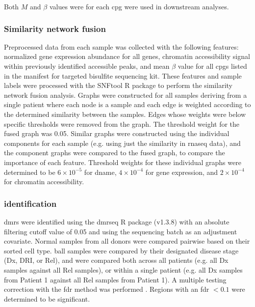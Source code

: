 Both $M$ and $\beta$ values were for each \gls{cpg} were used in downstream analyses.

\subsubsection{Similarity network fusion}

Preprocessed data from each sample was collected with the following features: normalized gene expression abundance for all genes, chromatin accessibility signal within previously identified accessible peaks, and mean $\beta$ value for all \glspl{cpg} listed in the manifest for targeted bisulfite sequencing kit.
These features and sample labels were processed with the SNFtool R package \cite{wangSimilarityNetworkFusion2014} to perform the similarity network fusion analysis.
Graphs were constructed for all samples deriving from a single patient where each node is a sample and each edge is weighted according to the determined similarity between the samples.
Edges whose weights were below specific thresholds were removed from the graph.
The threshold weight for the fused graph was 0.05.
Similar graphs were constructed using the individual components for each sample (e.g. using just the similarity in \gls{rnaseq} data), and the component graphs were compared to the fused graph, to compare the importance of each feature.
Threshold weights for these individual graphs were determined to be $6 \times 10^{-5}$ for \gls{dname}, $4 \times 10^{-4}$ for gene expression, and $2 \times 10^{-4}$ for chromatin accessibility.

\subsubsection{ identification}

\Glspl{dmr} were identified using the dmrseq R package (v1.3.8) \cite{korthauerDetectionAccurateFalse2018} with an absolute filtering cutoff value of 0.05 and using the sequencing batch as an adjustment covariate.
Normal samples from all donors were compared pairwise based on their sorted cell type.
\Gls{ball} samples were compared by their designated disease stage (Dx, DRI, or Rel), and were compared both across all patients (e.g. all Dx samples against all Rel samples), or within a single patient (e.g. all Dx samples from Patient 1 against all Rel samples from Patient 1).
A multiple testing correction with the \gls{fdr} method was performed \cite{benjaminiControllingFalseDiscovery1995}.
Regions with an \gls{fdr} $< 0.1$ were determined to be significant.

